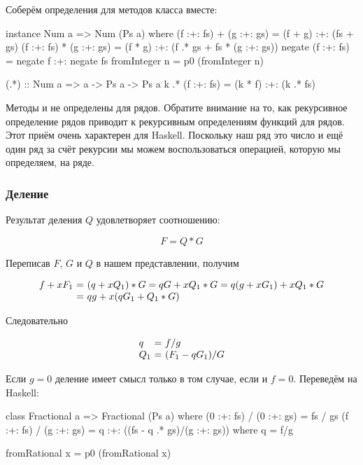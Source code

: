 Соберём определения для методов класса  вместе:


\begin{code}
instance Num a => Num (Ps a) where
    (f :+: fs) + (g :+: gs) = (f + g) :+: (fs + gs)
    (f :+: fs) * (g :+: gs) = (f * g) :+: (f .* gs + fs * (g :+: gs))
    negate (f :+: fs) = negate f :+: negate fs
    fromInteger n = p0 (fromInteger n)


(.*) :: Num a => a -> Ps a -> Ps a
k .* (f :+: fs) = (k * f) :+: (k .* fs)  
\end{code}


Методы  и  не определены для рядов.
Обратите внимание на то, как рекурсивное определение рядов
приводит к рекурсивным определениям функций для рядов.
Этот приём очень характерен для Haskell. Поскольку наш 
ряд это число и ещё один ряд за счёт рекурсии мы можем 
воспользоваться операцией, которую мы определяем, на 
 ряде.

\subsubsection{Деление}

Результат деления $Q$ удовлетворяет соотношению:

\[ F = Q * G \]

Переписав $F$, $G$ и $Q$ в нашем представлении, получим

\[\begin{array}{l@{\ = \ }l}
f + x F_1 &  (q + x Q_1) * G = qG + x Q_1 * G = q(g + x G_1) + x Q_1 * G \\
          & q g + x (q G_1 + Q_1 * G) \\
\end{array}\]

Следовательно 

\[\begin{array}{l@{\ = \ }l}
q    &  f/g  \\
Q_1  &  (F_1 - q G_1)/G \\
\end{array}\]

Если $g = 0$ деление имеет смысл только в том случае, если и
$f = 0$. Переведём на Haskell:


\begin{code}
class Fractional a => Fractional (Ps a) where
    (0 :+: fs) / (0 :+: gs) = fs / gs
    (f :+: fs) / (g :+: gs) = q :+: ((fs - q .* gs)/(g :+: gs))
        where q = f/g

    fromRational x = p0 (fromRational x)
\end{code}

